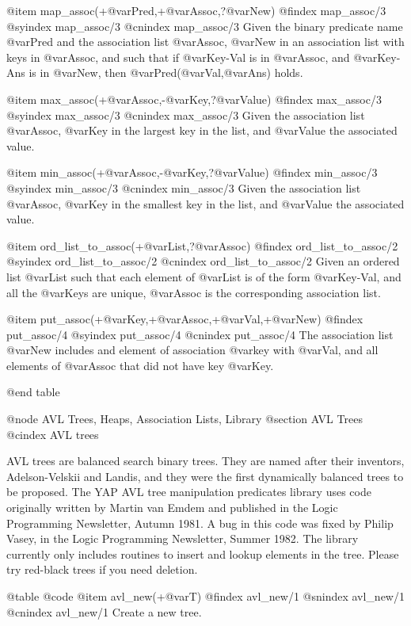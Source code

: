 {{{{{{{{{@item map_assoc(+@var{Pred},+@var{Assoc},?@var{New})
@findex map_assoc/3
@syindex map_assoc/3
@cnindex map_assoc/3
Given the binary predicate name @var{Pred} and the association list
@var{Assoc}, @var{New} in an association list with keys in @var{Assoc},
and such that if @var{Key-Val} is in @var{Assoc}, and @var{Key-Ans} is in
@var{New}, then @var{Pred}(@var{Val},@var{Ans}) holds.

@item max_assoc(+@var{Assoc},-@var{Key},?@var{Value})
@findex max_assoc/3
@syindex max_assoc/3
@cnindex max_assoc/3
Given the association list
@var{Assoc}, @var{Key} in the largest key in the list, and @var{Value}
the associated value.

@item min_assoc(+@var{Assoc},-@var{Key},?@var{Value})
@findex min_assoc/3
@syindex min_assoc/3
@cnindex min_assoc/3
Given the association list
@var{Assoc}, @var{Key} in the smallest key in the list, and @var{Value}
the associated value.

@item ord_list_to_assoc(+@var{List},?@var{Assoc})
@findex ord_list_to_assoc/2
@syindex ord_list_to_assoc/2
@cnindex ord_list_to_assoc/2
Given an ordered list @var{List} such that each element of @var{List} is
of the form @var{Key-Val}, and all the @var{Keys} are unique, @var{Assoc} is
the corresponding association list.

@item put_assoc(+@var{Key},+@var{Assoc},+@var{Val},+@var{New})
@findex put_assoc/4
@syindex put_assoc/4
@cnindex put_assoc/4
The association list @var{New} includes and element of association
@var{key} with @var{Val}, and all elements of @var{Assoc} that did not
have key @var{Key}.

@end table

@node AVL Trees, Heaps, Association Lists, Library
@section AVL Trees
@cindex AVL trees

AVL trees are balanced search binary trees. They are named after their
inventors, Adelson-Velskii and Landis, and they were the first
dynamically balanced trees to be proposed. The YAP AVL tree manipulation
predicates library uses code originally written by Martin van Emdem and
published in the Logic Programming Newsletter, Autumn 1981.  A bug in
this code was fixed by Philip Vasey, in the Logic Programming
Newsletter, Summer 1982. The library currently only includes routines to
insert and lookup elements in the tree. Please try red-black trees if
you need deletion.

@table @code
@item avl_new(+@var{T})
@findex avl_new/1
@snindex avl_new/1
@cnindex avl_new/1
Create a new tree.

}}}}}}}}}
